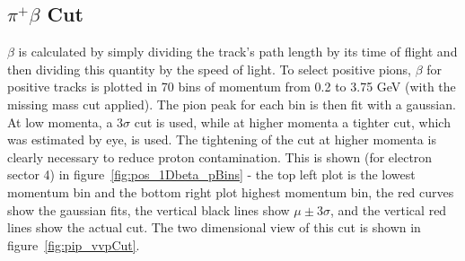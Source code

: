 \subsection{$\pi^+ \beta$ Cut}
$\beta$ is calculated by simply dividing the track's path length by its time of flight and then dividing this quantity by the speed of light.
To select positive pions, $\beta$ for positive tracks is plotted in 70 bins of momentum from 0.2 to 3.75 GeV (with the missing mass cut applied).
The pion peak for each bin is then fit with a gaussian.
At low momenta, a $3\sigma$ cut is used, while at higher momenta a tighter cut, which was estimated by eye, is used.
The tightening of the cut at higher momenta is clearly necessary to reduce proton contamination.
This is shown (for electron sector 4) in figure~\ref{fig:pos_1Dbeta_pBins} - the top left plot is the lowest momentum bin and the bottom right plot highest momentum bin, the red curves show the gaussian fits, the vertical black lines show $\mu \pm 3\sigma$, and the vertical red lines show the actual cut.
The two dimensional view of this cut is shown in figure~\ref{fig:pip_vvpCut}.

